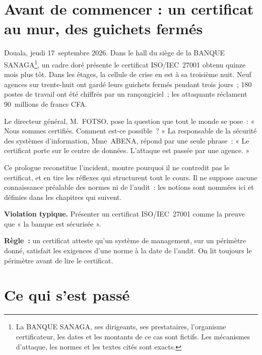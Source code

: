 \bigskip

\section*{Avant de commencer : un certificat au mur, des guichets fermés}

Douala, jeudi 17~septembre 2026. Dans le hall du siège de la BANQUE
SANAGA\footnote{La BANQUE SANAGA, ses dirigeants, ses prestataires,
l'organisme certificateur, les dates et les montants de ce cas sont fictifs.
Les mécanismes d'attaque, les normes et les textes cités sont exacts.}, un
cadre doré présente le certificat ISO/IEC~27001 obtenu quinze mois plus tôt.
Dans les étages, la cellule de crise en est à sa troisième nuit. Neuf
agences sur trente-huit ont gardé leurs guichets fermés pendant trois jours~;
180 postes de travail ont été chiffrés par un rançongiciel~; les attaquants
réclament 90~millions de francs CFA.

Le directeur général, M.~FOTSO, pose la question que tout le monde se pose~:
« Nous sommes certifiés. Comment est-ce possible~? » La responsable de la
sécurité des systèmes d'information, Mme~ABENA, répond par une seule
phrase~: « Le certificat porte sur le centre de données. L'attaque est
passée par une agence. »

\medskip

Ce prologue reconstitue l'incident, montre pourquoi il ne contredit pas le
certificat, et en tire les réflexes qui structurent tout le cours. Il ne
suppose aucune connaissance préalable des normes ni de l'audit~: les notions
sont nommées ici et définies dans les chapitres qui suivent.

\begin{boxalert}
\textbf{Violation typique.} Présenter un certificat ISO/IEC~27001 comme la
preuve que « la banque est sécurisée ».

\smallskip
\textbf{Règle~:} un certificat atteste qu'un système de management, sur un
périmètre donné, satisfait les exigences d'une norme à la date de l'audit.
On lit toujours le périmètre avant de lire le certificat.
\end{boxalert}

\separateur

\section{Ce qui s'est passé}
\label{sec:pro-faits}

